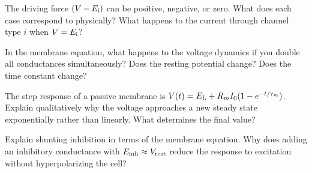 \begin{conceptquestions}
  \item The driving force $(V - E_{\mathrm{i}})$ can be positive, negative, or zero. What does each case correspond to physically? What happens to the current through channel type $i$ when $V = E_{\mathrm{i}}$?

  \item In the membrane equation, what happens to the voltage dynamics if you double all conductances simultaneously? Does the resting potential change? Does the time constant change?

  \item The step response of a passive membrane is $V(t) = E_{\mathrm{L}} + R_m I_0(1 - e^{-t/\tau_m})$. Explain qualitatively why the voltage approaches a new steady state exponentially rather than linearly. What determines the final value?

  \item Explain shunting inhibition in terms of the membrane equation. Why does adding an inhibitory conductance with $E_{\mathrm{\text{inh}}} \approx V_{\text{rest}}$ reduce the response to excitation without hyperpolarizing the cell?
\end{conceptquestions}
